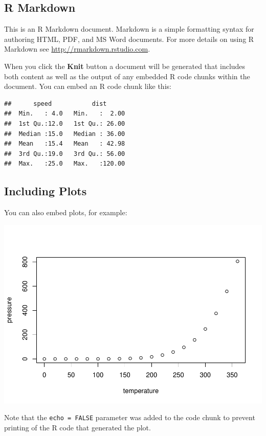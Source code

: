 \documentclass{crebsshr}
\begin{document}

\subsection{R Markdown}\label{r-markdown}

This is an R Markdown document. Markdown is a simple formatting syntax
for authoring HTML, PDF, and MS Word documents. For more details on
using R Markdown see \url{http://rmarkdown.rstudio.com}.

When you click the \textbf{Knit} button a document will be generated
that includes both content as well as the output of any embedded R code
chunks within the document. You can embed an R code chunk like this:

\begin{Shaded}
\begin{Highlighting}[]
\end{Highlighting}
\end{Shaded}

\begin{verbatim}
##      speed           dist       
##  Min.   : 4.0   Min.   :  2.00  
##  1st Qu.:12.0   1st Qu.: 26.00  
##  Median :15.0   Median : 36.00  
##  Mean   :15.4   Mean   : 42.98  
##  3rd Qu.:19.0   3rd Qu.: 56.00  
##  Max.   :25.0   Max.   :120.00
\end{verbatim}

\subsection{Including Plots}\label{including-plots}

You can also embed plots, for example:

\includegraphics{plroba_latex_files/figure-latex/pressure-1.pdf}

Note that the \texttt{echo\ =\ FALSE} parameter was added to the code
chunk to prevent printing of the R code that generated the plot.



\end{document}
